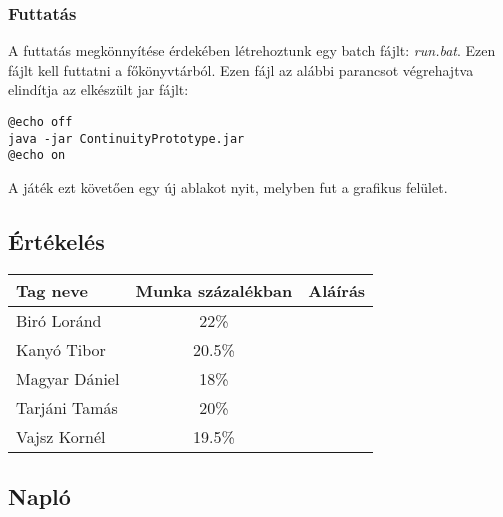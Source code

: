 \subsubsection{Futtatás}
A futtatás megkönnyítése érdekében létrehoztunk egy batch fájlt: \emph{run.bat}. Ezen fájlt kell futtatni a főkönyvtárból. Ezen fájl az alábbi parancsot végrehajtva elindítja az elkészült jar fájlt: 

\begin{verbatim}
@echo off
java -jar ContinuityPrototype.jar
@echo on
\end{verbatim}

A játék ezt követően egy új ablakot nyit, melyben fut a grafikus felület.

\subsection{Értékelés}
\begin{tabular}{|p{130pt}|c|p{150pt}|}
\hline 
\textbf{Tag neve} & \textbf{Munka százalékban} & \textbf{Aláírás}\\ 
\hline 
Biró Loránd & 22\% & \\ 
\hline 
Kanyó Tibor & 20.5\% & \\
\hline 
Magyar Dániel & 18\% & \\
\hline 
Tarjáni Tamás & 20\% & \\
\hline 
Vajsz Kornél & 19.5\% & \\
\hline 
\end{tabular} 
\newpage

\subsection{Napló}

